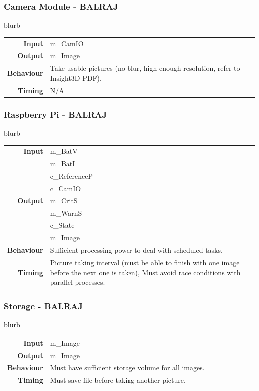 \documentclass[10pt,letterpaper]{article}
\begin{document}
\subsubsection{Camera Module - BALRAJ}
blurb
\begin{center}
  \begin{tabular}{r p{8.5cm}}
      \textbf{Input} & m\_CamIO \\
      \textbf{Output} & m\_Image \\
      \textbf{Behaviour} & Take usable pictures (no blur, high enough resolution, refer to Insight3D PDF).  \\
      \textbf{Timing} & N/A\\
  \end{tabular}
\end{center}

\subsubsection{Raspberry Pi - BALRAJ}
blurb
\begin{center}
  \begin{tabular}{r p{8.5cm}}
      \textbf{Input} & m\_BatV \\ & m\_BatI\\ & c\_ReferenceP\\ & c\_CamIO \\
      \textbf{Output} & m\_CritS\\ & m\_WarnS\\ & c\_State\\& m\_Image \\
      \textbf{Behaviour} & Sufficient processing power to deal with scheduled tasks. \\
      \textbf{Timing} & Picture taking interval (must be able to finish with one image before the next one is taken), Must avoid race conditions with parallel processes. \\
  \end{tabular}
\end{center}

\subsubsection{Storage - BALRAJ}
blurb
\begin{center}
  \begin{tabular}{r p{8.5cm}}
      \textbf{Input} & m\_Image \\
      \textbf{Output} & m\_Image \\
      \textbf{Behaviour} & Must have sufficient storage volume for all images. \\
      \textbf{Timing} & Must save file before taking another picture. \\
  \end{tabular}
\end{center}
\end{document}
